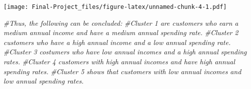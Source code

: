 \documentclass[
]{article}
\newenvironment{Shaded}{\begin{snugshade}}{\end{snugshade}}
\newcommand{\CommentTok}[1]{\textcolor[rgb]{0.56,0.35,0.01}{\textit{#1}}}
\begin{document}
\texttt{[image: Final-Project\_files/figure-latex/unnamed-chunk-4-1.pdf]}

\begin{Shaded}
\begin{Highlighting}[]
\CommentTok{\#Thus, the following can be concluded:}
\CommentTok{\#Cluster 1 are customers who earn a medium annual income and have a medium annual spending rate. }
\CommentTok{\#Cluster 2 customers who have a high annual income and a low annual spending rate. }
\CommentTok{\#Cluster 3 costumers who have low annual incomes and a high annual spending rates.}
\CommentTok{\#Cluster 4 customers with high annual incomes and have high annual spending rates. }
\CommentTok{\#Cluster 5 shows that customers with low annual incomes and low annual spending rates. }
\end{Highlighting}
\end{Shaded}
\end{document}
